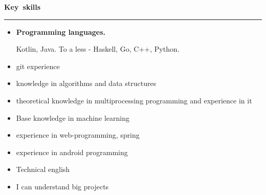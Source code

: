 \documentclass[10pt, a4paper]{report}
\begin{document}
    \par\hbox{\large\textbf{Key skills}}\kern5pt\hrule\kern5pt

    \begin{itemize}

        \item \textbf{Programming languages.}

        Kotlin, Java. To a less - Haskell, Go, C++, Python.

        \item git experience
        \item knowledge in algorithms and data structures
        \item theoretical knowledge in multiprocessing programming and experience in it
        \item Base knowledge in machine learning
        \item experience in web-programming, spring
        \item experience in android programming
        \item Technical english
        \item I can understand big projects\\
    \end{itemize}
\end{document}

